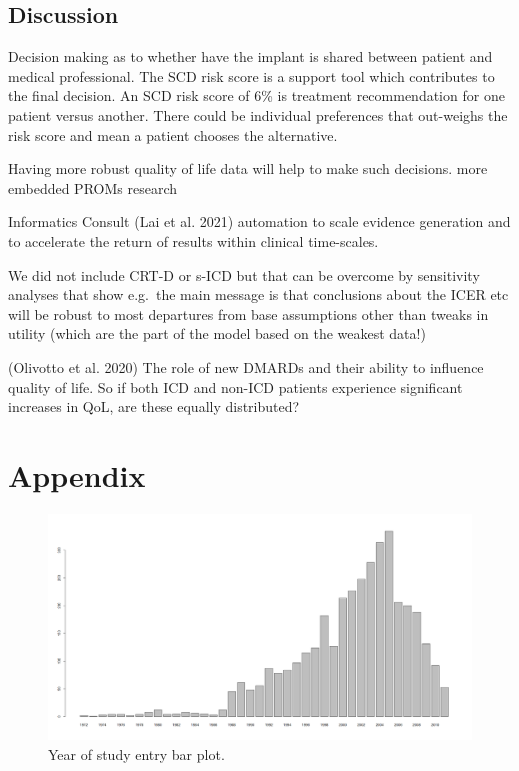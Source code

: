 \documentclass[
]{article}
\begin{document}
\hypertarget{discussion}{%
\subsection{Discussion}\label{discussion}}

Decision making as to whether have the implant is shared between patient and medical professional.
The SCD risk score is a support tool which contributes to the final decision.
An SCD risk score of 6\% is treatment recommendation for one patient versus another.
There could be individual preferences that out-weighs the risk score and mean a patient chooses the alternative.

Having more robust quality of life data will help to make such decisions.
more embedded PROMs research

Informatics Consult (Lai et al. 2021) automation to scale evidence generation and to accelerate the return of results within clinical time-scales.

We did not include CRT-D or s-ICD but that can be overcome by sensitivity analyses that show e.g.~the main message is that conclusions about the ICER etc will be robust to most departures from base assumptions other than tweaks in utility (which are the part of the model based on the weakest data!)

(Olivotto et al. 2020) The role of new DMARDs and their ability to influence quality of life.
So if both ICD and non-ICD patients experience significant increases in QoL, are these equally distributed?

\hypertarget{appendix}{%
\section{Appendix}\label{appendix}}

\begin{figure}

{\centering \includegraphics[width=0.8\linewidth]{../../images/year_of_entry_barplot} 

}

\caption{Year of study entry bar plot.}\label{fig:barplot}
\end{figure}
\end{document}
